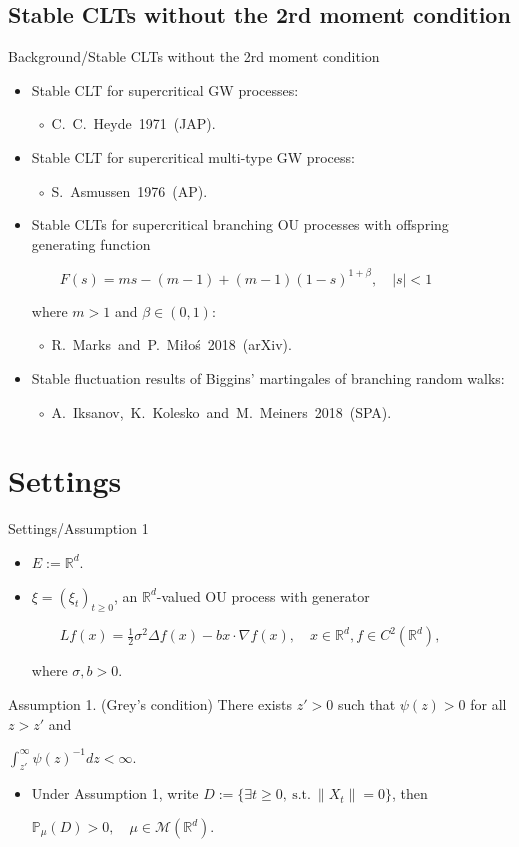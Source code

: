 \documentclass[xcolor=dvipsnames]{beamer}
\begin{document}
\subsection{Stable CLTs without the 2rd moment condition}
\begin{frame}{Background/Stable CLTs without the 2rd moment condition}
\begin{itemize}
\item
	{\color{red} Stable CLT for supercritical GW processes:}

  \mbox{ $\circ$ C. C. Heyde 1971 (JAP).}
\item
	{\color{red} Stable CLT for supercritical multi-type GW process:} 
  
  \mbox{ $\circ$ S. Asmussen 1976 (AP).}
\item
	{\color{red} Stable CLTs for supercritical branching OU processes} with offspring generating function

\( \displaystyle
    \qquad F(s)
    = ms -(m-1) +(m-1) (1-s)^{1+\beta},
    \quad |s|< 1
\)

	where $m>1$ and $\beta\in (0, 1)$:

  \mbox{ $\circ$ R. Marks and P. Mi{\l}o{\'s} 2018 (arXiv).}
\item
	{\color{red} Stable fluctuation results of Biggins’ martingales of branching random walks:} 

  \mbox{ $\circ$ A. Iksanov, K. Kolesko and M. Meiners 2018 (SPA).}
\end{itemize}
\end{frame}


\section{Settings}
\begin{frame}{Settings/Assumption 1}
\begin{itemize}
\item
	$E:= \mathbb R^d$.
\item
  $\xi = (\xi_t)_{t\geq 0}$, an $\mathbb R^d$-valued OU process with generator
  
  \( \displaystyle \qquad
	Lf(x)
	=\frac{1}{2} \sigma^2 \Delta f(x)-bx\cdot\nabla f(x),
	\quad x\in \mathbb R^d, f\in C^2(\mathbb R^d),
  \)

	where $\sigma,b>0$.
\end{itemize}
\begin{block}{Assumption 1. (Grey's condition)}
	There exists $z' > 0$ such that $\psi(z) > 0$ for all $z>z'$ and  
  \centerline{ \( \displaystyle
    \int_{z'}^\infty \psi(z)^{-1}dz 
    < \infty.
    \)}
\end{block}
\begin{itemize}
\item
	Under Assumption 1, write $D := \{\exists t\geq 0,~\text{s.t.}~\|X_t\|=0\}$, then

  \centerline{ \( \displaystyle
    \mathbb P_\mu(D)
    > 0, 
    \quad \mu \in \mathcal M(\mathbb R^d).
  \)}
\end{itemize}
\end{frame}
\end{document}
